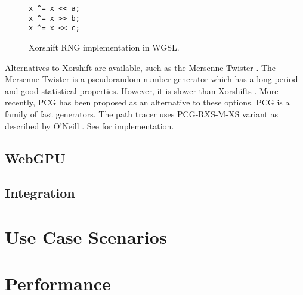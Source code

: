 \begin{figure}[H]
\begin{lstlisting}[style=wgsl]
x ^= x << a;
x ^= x >> b;
x ^= x << c;
\end{lstlisting}
\caption{Xorshift RNG implementation in WGSL.}
\label{code:xorShift}
\end{figure}

Alternatives to Xorshift are available, such as the Mersenne Twister \cite{rngMersenneTwister}. The Mersenne Twister is a pseudorandom number generator which has a long period and good statistical properties. However, it is slower than Xorshifts \cite{o2014pcg}. More recently, PCG has been proposed as an alternative to these options. PCG is a family of fast generators. The path tracer uses PCG-RXS-M-XS variant as described by O’Neill \cite{o2014pcg}. See  for implementation.

\subsection{WebGPU}
\subsection{Integration}
\section{Use Case Scenarios}
\section{Performance}